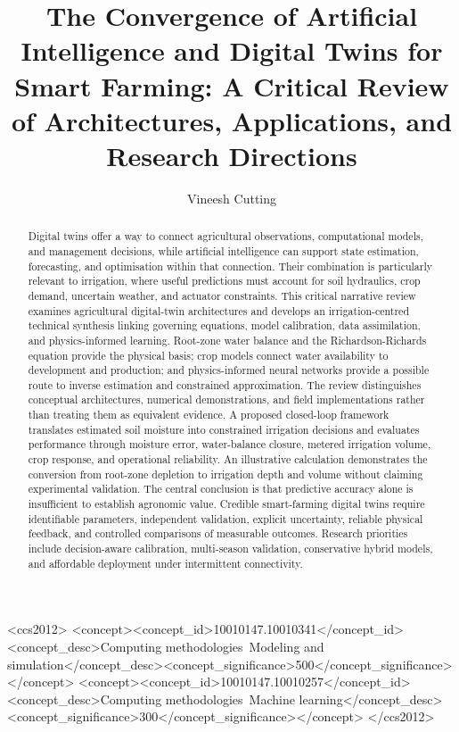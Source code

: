\documentclass[acmsmall,screen,nonacm]{acmart}
\begin{document}
\title[AI and Digital Twins for Smart Farming]{The Convergence of Artificial Intelligence and Digital Twins for Smart Farming: A Critical Review of Architectures, Applications, and Research Directions}
\author{Vineesh Cutting}
\renewcommand{\shortauthors}{Vineesh Cutting}
\begin{abstract}
Digital twins offer a way to connect agricultural observations, computational models, and management decisions, while artificial intelligence can support state estimation, forecasting, and optimisation within that connection. Their combination is particularly relevant to irrigation, where useful predictions must account for soil hydraulics, crop demand, uncertain weather, and actuator constraints. This critical narrative review examines agricultural digital-twin architectures and develops an irrigation-centred technical synthesis linking governing equations, model calibration, data assimilation, and physics-informed learning. Root-zone water balance and the Richardson-Richards equation provide the physical basis; crop models connect water availability to development and production; and physics-informed neural networks provide a possible route to inverse estimation and constrained approximation. The review distinguishes conceptual architectures, numerical demonstrations, and field implementations rather than treating them as equivalent evidence. A proposed closed-loop framework translates estimated soil moisture into constrained irrigation decisions and evaluates performance through moisture error, water-balance closure, metered irrigation volume, crop response, and operational reliability. An illustrative calculation demonstrates the conversion from root-zone depletion to irrigation depth and volume without claiming experimental validation. The central conclusion is that predictive accuracy alone is insufficient to establish agronomic value. Credible smart-farming digital twins require identifiable parameters, independent validation, explicit uncertainty, reliable physical feedback, and controlled comparisons of measurable outcomes. Research priorities include decision-aware calibration, multi-season validation, conservative hybrid models, and affordable deployment under intermittent connectivity.

\end{abstract}
\begin{CCSXML}
<ccs2012>
<concept><concept_id>10010147.10010341</concept_id><concept_desc>Computing methodologies~Modeling and simulation</concept_desc><concept_significance>500</concept_significance></concept>
<concept><concept_id>10010147.10010257</concept_id><concept_desc>Computing methodologies~Machine learning</concept_desc><concept_significance>300</concept_significance></concept>
</ccs2012>
\end{CCSXML}
\end{document}
